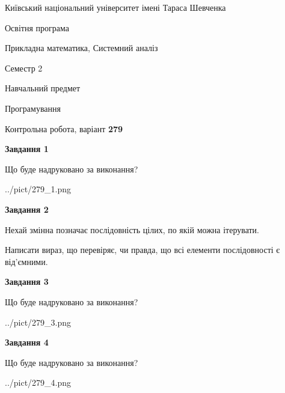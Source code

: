 \documentclass[12pt, ukrainian]{article}
\begin{document}
{{\begin {small}\par
{ \center  Київський національний університет імені Тараса Шевченка \par}
{\parbox {5 cm}{Освітня програма \hfill}{\parbox {8 cm}{Прикладна математика, Системний аналіз \hfill}}\parbox {5 cm}{\hfill Семестр 2}}\par
{\parbox {5 cm} {Навчальний предмет \hfill}\parbox {7 cm}{Програмування \hfill}\parbox {6cm}{\hfill}\par}\vspace{-7pt} \end{small}}{\center Контрольна робота, варіант  \No \textbf
{ 279 }\par}}
{
\begin {large}
{\begin {center}\textbf{Завдання 1}\end {center}}\par
Що буде надруковано за виконання?\par\par
\begin{center}
	{../pict/279_1.png}
\end{center}
\newpage

{\begin {center}\textbf{Завдання 2}\end {center}}\par
Нехай змінна  позначає послідовність цілих, по якій можна ітерувати.

Написати вираз, що перевіряє, чи правда, що всі елементи послідовності є від’ємни\-ми.\par
\newpage

{\begin {center}\textbf{Завдання 3}\end {center}}\par
Що буде надруковано за виконання?\par
\begin{center}
	{../pict/279_3.png}
\end{center}
\newpage

{\begin {center}\textbf{Завдання 4}\end {center}}\par
Що буде надруковано за виконання?\par
\begin{center}
	{../pict/279_4.png}
\end{center}
\newpage


\end{large}}
\end{document}
